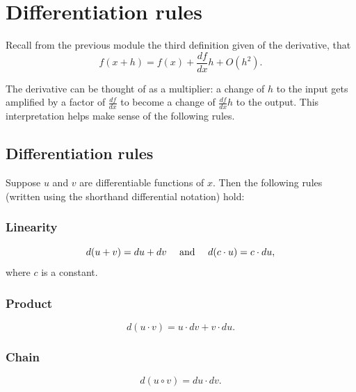 \documentclass[twoside,openright,titlepage,a4paper]{book}
\begin{document}
\begin{sloppypar}
\section{Differentiation rules} \label{ChDifferentiationSecDifferentiationRules}

Recall from the previous module the third definition given of the derivative, that \[ f(x+h) = f(x) + \frac{df}{dx}h + O(h^2). \]

The derivative can be thought of as a multiplier: a change of $h$ to the input gets amplified by a factor of $\frac{df}{dx}$ to become a change of $\frac{df}{dx}h$ to the output. This interpretation helps make sense of the following rules.

\subsection{Differentiation rules}

Suppose $u$ and $v$ are differentiable functions of $x$. Then the following rules (written using the shorthand differential notation) hold:

\subsubsection{Linearity}

\[ d(u+v) = du + dv \quad \hbox{ and } \quad d(c\cdot u) = c \cdot du, \] where $c$ is a constant.

\subsubsection{Product}

\[ d(u \cdot v) = u \cdot dv + v \cdot du. \]

\subsubsection{Chain}

\[ d(u\circ v) = du \cdot dv. \]


\end{sloppypar}
\end{document}
